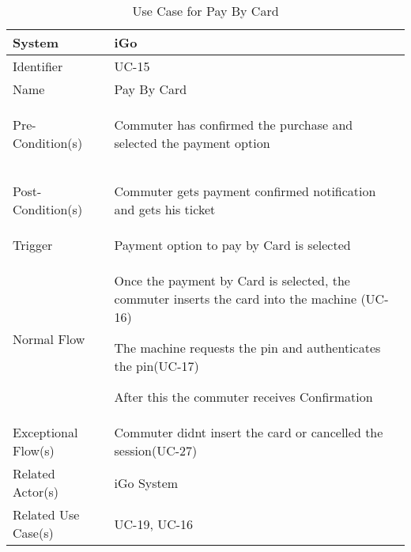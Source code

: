 \begin{table}[ht]
    \centering
    \begin{tabular}{|l|p{11cm}|}
        \hline
        System             & iGo\\
        \hline
        Identifier         & UC-15 \\
        \hline
        Name               & Pay By Card \\
        \hline
        Pre-Condition(s)   & 
        \begin{enumerate*}[itemjoin=\newline]
            \item Commuter has confirmed the purchase and selected the payment option
        \end{enumerate*} \\
        \hline
        Post-Condition(s)  & 
        \begin{enumerate*}[itemjoin=\newline]
            \item Commuter gets payment confirmed notification and gets his ticket
        \end{enumerate*} \\
        \hline
        Trigger            & Payment option to pay by Card is selected \\
        \hline
        Normal Flow        & 
        \begin{enumerate*}[itemjoin=\newline]
            \item Once the payment by Card is selected, the commuter inserts the card into the machine (UC-16)
            \item The machine requests the pin and authenticates the pin(UC-17)
            \item After this the commuter receives Confirmation
        \end{enumerate*} \\
        \hline
        Exceptional Flow(s)& Commuter didnt insert the card or cancelled the session(UC-27)\\
        \hline
        Related Actor(s)   & iGo System \\
        \hline
        Related Use Case(s)&  UC-19, UC-16\\
        \hline
    \end{tabular}
    \caption{Use Case for Pay By Card}
    \label{tab:UC_PayByCard}
\end{table}
